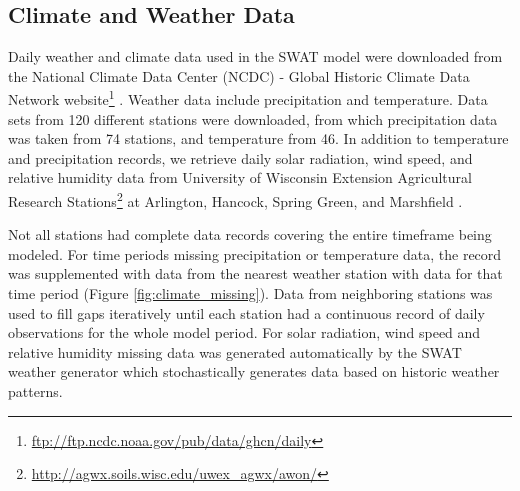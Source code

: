\subsection{Climate and Weather Data}\label{sec:climate_data}

Daily weather and climate data used in the SWAT model were downloaded from the National Climate Data Center (NCDC) - Global Historic Climate Data Network website\footnote{\url{ftp://ftp.ncdc.noaa.gov/pub/data/ghcn/daily}} \citep{ncdc_ghcn_2012}. Weather data include precipitation and temperature.  Data sets from 120 different stations were downloaded, from which precipitation data was taken from 74 stations, and temperature from 46. In addition to temperature and precipitation records, we retrieve daily solar radiation, wind speed, and relative humidity data from University of Wisconsin Extension Agricultural Research Stations\footnote{\url{http://agwx.soils.wisc.edu/uwex_agwx/awon/}} at Arlington, Hancock, Spring Green, and Marshfield .   

Not all stations had complete data records covering the entire timeframe being modeled.  For time periods missing precipitation or temperature data, the record was supplemented with data from the nearest weather station with data for that time period (Figure \ref{fig:climate_missing}). Data from neighboring stations was used to fill gaps iteratively until each station had a continuous record of daily observations for the whole model period. For solar radiation, wind speed and relative humidity missing data was generated automatically by the SWAT weather generator which stochastically generates data based on historic weather patterns.
